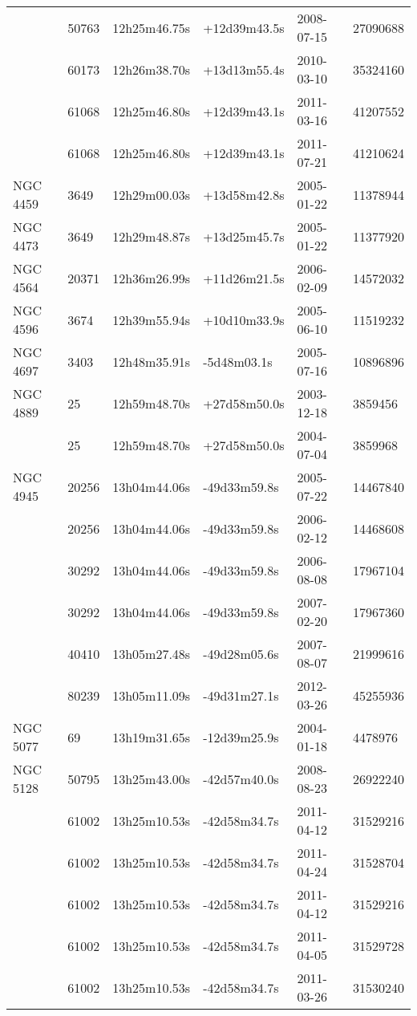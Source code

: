 \begin{table*}
\begin{center}
\begin{tabular}{llllll}
   & 50763 & 12h25m46.75s & +12d39m43.5s & 2008-07-15 & 27090688\\
   & 60173 & 12h26m38.70s & +13d13m55.4s & 2010-03-10 & 35324160\\
   & 61068 & 12h25m46.80s & +12d39m43.1s & 2011-03-16 & 41207552\\
   & 61068 & 12h25m46.80s & +12d39m43.1s & 2011-07-21 & 41210624\\
  NGC 4459 & 3649 & 12h29m00.03s & +13d58m42.8s & 2005-01-22 & 11378944\\
  NGC 4473 & 3649 & 12h29m48.87s & +13d25m45.7s & 2005-01-22 & 11377920\\
  NGC 4564 & 20371 & 12h36m26.99s & +11d26m21.5s & 2006-02-09 & 14572032\\
  NGC 4596 & 3674 & 12h39m55.94s & +10d10m33.9s & 2005-06-10 & 11519232\\
  NGC 4697 & 3403 & 12h48m35.91s & -5d48m03.1s & 2005-07-16 & 10896896\\
  NGC 4889 & 25 & 12h59m48.70s & +27d58m50.0s & 2003-12-18 & 3859456\\
   & 25 & 12h59m48.70s & +27d58m50.0s & 2004-07-04 & 3859968\\
  NGC 4945 & 20256 & 13h04m44.06s & -49d33m59.8s & 2005-07-22 & 14467840\\
   & 20256 & 13h04m44.06s & -49d33m59.8s & 2006-02-12 & 14468608\\
   & 30292 & 13h04m44.06s & -49d33m59.8s & 2006-08-08 & 17967104\\
   & 30292 & 13h04m44.06s & -49d33m59.8s & 2007-02-20 & 17967360\\
   & 40410 & 13h05m27.48s & -49d28m05.6s & 2007-08-07 & 21999616\\
   & 80239 & 13h05m11.09s & -49d31m27.1s & 2012-03-26 & 45255936\\
  NGC 5077 & 69 & 13h19m31.65s & -12d39m25.9s & 2004-01-18 & 4478976\\
  NGC 5128 & 50795 & 13h25m43.00s & -42d57m40.0s & 2008-08-23 & 26922240\\
   & 61002 & 13h25m10.53s & -42d58m34.7s & 2011-04-12 & 31529216\\
   & 61002 & 13h25m10.53s & -42d58m34.7s & 2011-04-24 & 31528704\\
   & 61002 & 13h25m10.53s & -42d58m34.7s & 2011-04-12 & 31529216\\
   & 61002 & 13h25m10.53s & -42d58m34.7s & 2011-04-05 & 31529728\\
   & 61002 & 13h25m10.53s & -42d58m34.7s & 2011-03-26 & 31530240\\

\end{tabular}
\end{center}
\end{table*}
